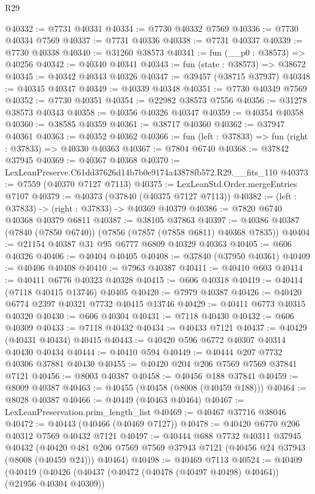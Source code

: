 \begin{lexlean}{R29}
\begin{coremodule}
@40332 := @7731 @40331
@40334 := @7730 @40332 @7569
@40336 := @7730 @40334 @7569
@40337 := @7731 @40336
@40338 := @7731 @40337
@40339 := @7730 @40338
@40340 := @31260 @38573
@40341 := fun (__p0 : @38573) => @40256
@40342 := @40340 @40341
@40343 := fun (state : @38573) => @38672
@40345 := @40342 @40343 @40326
@40347 := @39457 (@38715 @37937)
@40348 := @40345 @40347
@40349 := @40339 @40348
@40351 := @7730 @40349 @7569
@40352 := @7730 @40351
@40354 := @22982 @38573 @7556
@40356 := @31278 @38573 @40343
@40358 := @40356 @40326 @40347
@40359 := @40354 @40358
@40360 := @38585 @40359
@40361 := @38717 @40360
@40362 := @37947 @40361
@40363 := @40352 @40362
@40366 := fun (left : @37833) => fun (right : @37833) => @40330 @40363
@40367 := @7804 @6740
@40368 := @37842 @37945
@40369 := @40367 @40368
@40370 := LexLeanPreserve.C61dd37626d14b7b0e9174a43878fb572.R29.__fits_110
@40373 := @7559 (@40370 @7127 @7113)
@40375 := LexLeanStd.Order.mergeEntries @7107
@40379 := @40373 (@37840 (@40375 @7127 @7113))
@40382 := (left : @37833) -> (right : @37833) -> @40369 @40379
@40386 := @7820 @6740 @40368 @40379 @6811
@40387 := @38105 @37863
@40397 := @40386 @40387 (@7840 (@7850 @6740)) (@7856 (@7857 (@7858 @6811) @40368 @7835))
@40404 := @21154 @40387 @31 @95 @6777 @6809 @40329 @40363
@40405 := @606 @40326
@40406 := @40404 @40405
@40408 := @37840 (@37950 @40361)
@40409 := @40406 @40408
@40410 := @7963 @40387
@40411 := @40410 @603
@40414 := @40411 @6776 @40323 @40328
@40415 := @606 @40318
@40419 := @40414 (@7118 @40415 @13746) @40405
@40420 := @7979 @40387
@40426 := @40420 @6774 @2397 @40321 @7732 @40415 @13746
@40429 := @40411 @6773 @40315 @40320
@40430 := @606 @40304
@40431 := @7118 @40430
@40432 := @606 @40309
@40433 := @7118 @40432
@40434 := @40433 @7121
@40437 := @40429 (@40431 @40434) @40415
@40443 := @40420 @596 @6772 @40307 @40314 @40430 @40434
@40444 := @40410 @594
@40449 := @40444 @207 @7732 @40306 @37881 @40430
@40455 := @40420 @204 @206 @7569 @7569 @37841 @7121
@40456 := @8003 @40387
@40458 := @40456 @188 @37841
@40459 := @8009 @40387
@40463 := @40455 (@40458 (@8008 (@40459 @188)))
@40464 := @8028 @40387
@40466 := @40449 (@40463 @40464)
@40467 := LexLeanPreservation.prim_length_list
@40469 := @40467 @37716 @38046
@40472 := @40443 (@40466 (@40469 @7127))
@40478 := @40420 @6770 @206 @40312 @7569 @40432 @7121
@40497 := @40444
    @688
    @7732
    @40311
    @37945
    @40432
    (@40420 @481 @206 @7569 @7569 @37943 @7121 (@40456 @24 @37943 (@8008 (@40459 @24))) @40464)
@40498 := @40469 @7113
@40524 := @40409
    (@40419
      (@40426
        (@40437 (@40472 (@40478 (@40497 @40498) @40464)) (@21956 @40304 @40309))

\end{coremodule}
\end{lexlean}
